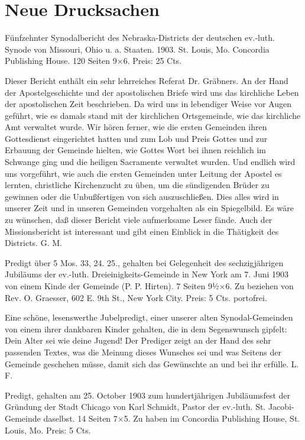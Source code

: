 \chapter{Neue Drucksachen}

Fünfzehnter Synodalbericht des Nebraska-Districts der deutschen ev.-luth. Synode von Missouri, Ohio u. a. Staaten. 1903. St. Louis, Mo. Concordia Publishing House. 120 Seiten 9×6. Preis: 25 Cts.

Dieser Bericht enthält ein sehr lehrreiches Referat Dr. Gräbners. An der Hand der Apostelgeschichte und der apostolischen Briefe wird uns das kirchliche Leben der apostolischen Zeit beschrieben. Da wird uns in lebendiger Weise vor Augen geführt, wie es damals stand mit der kirchlichen Ortsgemeinde, wie das kirchliche Amt verwaltet wurde. Wir hören ferner, wie die ersten Gemeinden ihren Gottesdienst eingerichtet hatten und zum Lob und Preis Gottes und zur Erbauung der Gemeinde hielten, wie Gottes Wort bei ihnen reichlich im Schwange ging und die heiligen Sacramente verwaltet wurden. Und endlich wird uns vorgeführt, wie auch die ersten Gemeinden unter Leitung der Apostel es lernten, christliche Kirchenzucht zu üben, um die sündigenden Brüder zu gewinnen oder die Unbußfertigen von sich auszuschließen. Dies alles wird in unserer Zeit und in unseren Gemeinden vorgehalten als ein Spiegelbild. Es wäre zu wünschen, daß dieser Bericht viele aufmerksame Leser fände. Auch der Missionsbericht ist interessant und gibt einen Einblick in die Thätigkeit des Districts. G. M.

Predigt über 5 Mos. 33, 24. 25., gehalten bei Gelegenheit des sechzigjährigen Jubiläums der ev.-luth. Dreieinigkeits-Gemeinde in New York am 7. Juni 1903 von einem Kinde der Gemeinde (P. P. Hirten). 7 Seiten 9½×6. Zu beziehen von Rev. O. Graesser, 602 E. 9th St., New York City. Preis: 5 Cts. portofrei.

Eine schöne, lesenswerthe Jubelpredigt, einer unserer alten Synodal-Gemeinden von einem ihrer dankbaren Kinder gehalten, die in dem Segenswunsch gipfelt: Dein Alter sei wie deine Jugend! Der Prediger zeigt an der Hand des sehr passenden Textes, was die Meinung dieses Wunsches sei und was Seitens der Gemeinde geschehen müsse, damit sich das Gewünschte an und bei ihr erfülle. L. F.

Predigt, gehalten am 25. October 1903 zum hundertjährigen Jubiläumsfest der Gründung der Stadt Chicago von Karl Schmidt, Pastor der ev.-luth. St. Jacobi-Gemeinde daselbst. 14 Seiten 7×5. Zu haben im Concordia Publishing House, St. Louis, Mo. Preis: 5 Cts.

